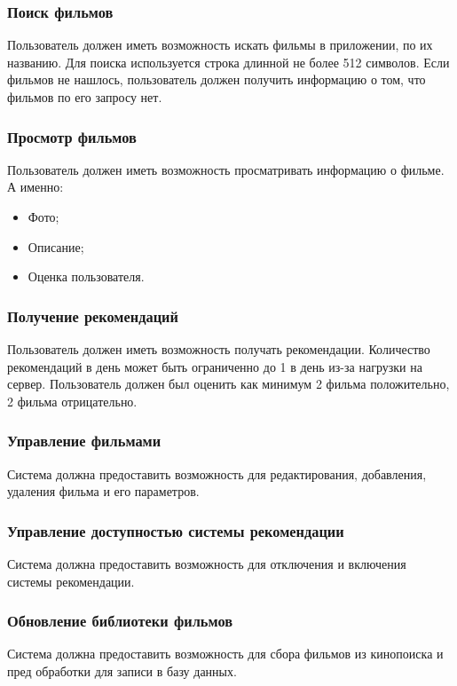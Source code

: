 \subsubsection{Поиск фильмов}
Пользователь должен иметь возможность искать фильмы в приложении, по их названию.
Для поиска используется строка длинной не более 512 символов.
Если фильмов не нашлось, пользователь должен получить информацию о том, что фильмов по его запросу нет.

\subsubsection{Просмотр фильмов}
Пользователь должен иметь возможность просматривать информацию о фильме.
А именно:
\begin{itemize}
    \item Фото;
    \item Описание;
    \item Оценка пользователя.
\end{itemize}

\subsubsection{Получение рекомендаций}
Пользователь должен иметь возможность получать рекомендации.
Количество рекомендаций в день может быть ограниченно до 1 в день из-за нагрузки на сервер.
Пользователь должен был оценить как минимум 2 фильма положительно, 2 фильма отрицательно.

\subsubsection{Управление фильмами}
Система должна предоставить возможность для редактирования, добавления, удаления фильма и его параметров.

\subsubsection{Управление доступностью системы рекомендации}
Система должна предоставить возможность для отключения и включения системы рекомендации.

\subsubsection{Обновление библиотеки фильмов}
Система должна предоставить возможность для сбора фильмов из кинопоиска и пред обработки для записи в базу данных.


